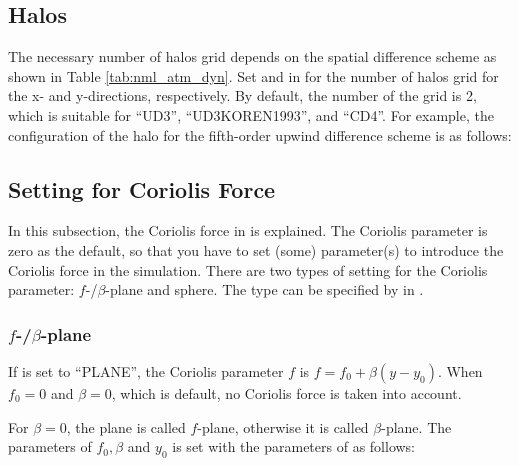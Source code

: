 \subsection{Halos}

The necessary number of halos grid depends on the spatial difference scheme as shown in Table \ref{tab:nml_atm_dyn}.
Set  and  in  for the number of halos grid for the x- and y-directions, respectively.
By default, the number of the grid is 2, which is suitable for ``UD3'', ``UD3KOREN1993'', and ``CD4''.
For example, the configuration of the halo for the fifth-order upwind difference scheme is as follows:



\subsection{Setting for Coriolis Force} \label{subsec:coriolis}

In this subsection, the Coriolis force in \scalerm is explained.
The Coriolis parameter is zero as the default, so that you have to set (some) parameter(s) to introduce the Coriolis force in the simulation.
There are two types of setting for the Coriolis parameter: $f$-/$\beta$-plane and sphere.
The type can be specified by  in .

\subsubsection{$f$-/$\beta$-plane}
If  is set to ``PLANE'', the Coriolis parameter $f$ is $f=f_0 + \beta (y-y_0)$.
When $f_0=0$ and $\beta=0$, which is default, no Coriolis force is taken into account.

For $\beta=0$, the plane is called $f$-plane, otherwise it is called $\beta$-plane.
The parameters of $f_0, \beta$ and $y_0$ is set with the parameters of  as follows:

